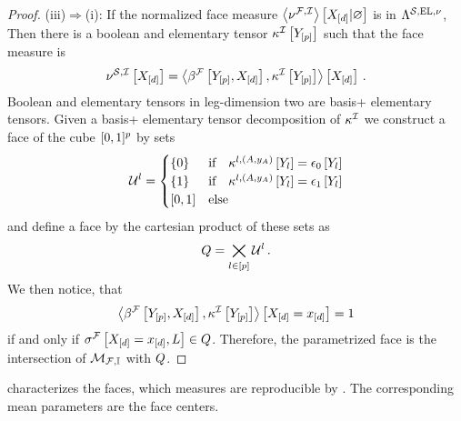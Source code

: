 \begin{proof}
    (iii)$\Rightarrow$(i):
    If the normalized face measure $\left\langle \nu^{\mathcal{F},\mathcal{I}}\right\rangle \left[ X_{[d]} | \varnothing \right]$ is in $\Lambda^{\mathcal{S},\mathrm{EL},\nu}$,
    Then there is a boolean and elementary tensor $\kappa^{\mathcal{I}}\left[Y_{[p]}\right]$ such that the face measure is
    \begin{align*}
        \nu^{\mathcal{S},\mathcal{I}}\left[X_{[d]}\right]
        = \left\langle \beta^{\mathcal{F}}\left[Y_{[p]},X_{[d]}\right],\kappa^{\mathcal{I}}\left[Y_{[p]}\right]\right\rangle \left[ X_{[d]} \right] \, .
    \end{align*}
    Boolean and elementary tensors in leg-dimension two are basis+ elementary tensors.
    Given a basis+ elementary tensor decomposition of $\kappa^{\mathcal{I}}$ we construct a face of the cube $[0,1]^{p}$ by sets
    \begin{align*}
        \mathcal{U}^{l} = \begin{cases}
                                   \{0\} & \text{if}\quad \kappa^{l,(A,y_{A})}\left[Y_{l}\right] = \epsilon_{0}\left[Y_{l}\right] \\
                                   \{1\} & \text{if}\quad \kappa^{l,(A,y_{A})}\left[Y_{l}\right] = \epsilon_{1}\left[Y_{l}\right] \\
                                   [0,1] & \text{else}
        \end{cases}
    \end{align*}
    and define a face by the cartesian product of these sets as
    \begin{align*}
        Q = \bigtimes_{l\in[p]} \mathcal{U}^{l} \, .
    \end{align*}
    We then notice, that
    \begin{align*}
        \left\langle \beta^{\mathcal{F}}\left[Y_{[p]},X_{[d]}\right],\kappa^{\mathcal{I}}\left[Y_{[p]}\right]\right\rangle \left[ X_{[d]}=x_{[d]} \right] = 1
    \end{align*}
    if and only if $\sigma^{\mathcal{F}}\left[X_{[d]}=x_{[d]},L\right]\in Q$.
    Therefore, the parametrized face is the intersection of $\mathcal{M}_{\mathcal{F},\mathbb{I}}$ with $Q$.
\end{proof}

 characterizes the faces, which measures are reproducible by \HardLogicNetworks{}.
The corresponding mean parameters are the face centers.


